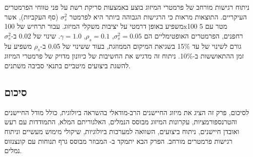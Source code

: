 ניתוח רגישות מורחב של פרמטרי המיזוג בוצע באמצעות סריקת רשת על פני טווחי הפרמטרים העיקריים. התוצאות מראות כי הרגישות הגבוהה ביותר היא לפרמטר $\sigma_{s}^{2}$ (סף העקביות), אשר משפיע באופן דרמטי על יציבות משקלי המיזוג. עבור תרחיש  של 100x100 מטר עם 5 רחפנים, הפרמטרים האופטימליים הם $\sigma_{s}^{2} = 0.05$, $\rho_{s} = 0.1$, $\gamma = 1.0$. שינוי של 0.02 ב-$\sigma_{s}^{2}$ גורם לשינוי של עד 15\% בשגיאת המיקום הממוזגת, בעוד ששינוי של 0.05 ב-$\rho_{s}$ משפיע על זמן ההתאוששות ב-10\%. ניתוח זה מדגיש את החשיבות של כיוונון מדויק של פרמטרי המיזוג להשגת ביצועים מיטביים בתנאי סביבה משתנים.

\subsection{סיכום}
\label{sec:ch03_summary}

לסיכום, פרק זה הציג את מיזוג החיישנים הרב-מודאלי בהשראה ביולוגית, כולל מודל החיישנים והטרנספורמציות, עקרונות המיזוג מבוסס הנמלים, האלגוריתם המלא, התמודדות עם רעש ואובדן חיישנים, ניתוח ביצועים, השוואה למערכות ביולוגיות, שיקולי מימוש מעשיים וניתוח רגישות פרמטרים מורחב. הפרק הבא יתמקד ב- המבוזר מבוסס גרף תנוחות עם קונצנזוס נמלים.

\cite{Lynen2013Fusion, Qin2018VINSMono, Zhang2014LOAM, Kalman1960, Thrun2005Probabilistic}
